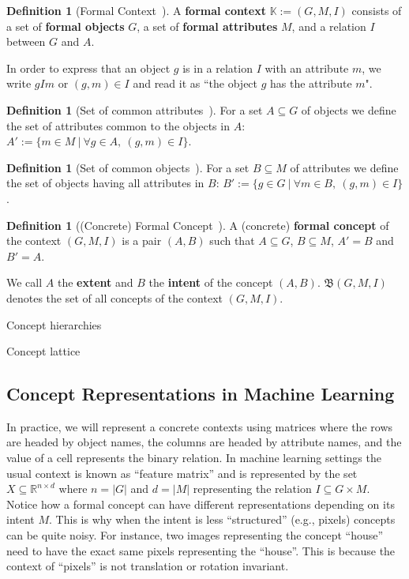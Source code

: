 \documentclass[withindex,glossary]{cam-thesis}
\theoremstyle{plain}
\theoremstyle{definition}
\newtheorem{definition}[theorem]{Definition}
\theoremstyle{remark}
\begin{document}
\begin{definition}[Formal Context~\citep{ganter1997formal}]
A \textbf{formal context} $\mathbb{K} := (G,M,I)$ consists of a set of \textbf{formal objects} $G$, a set of \textbf{formal attributes} $M$, and a relation $I$ between $G$ and $A$.
\end{definition}

In order to express that an object $g$ is in a relation $I$ with an attribute $m$, we write $gIm$ or $(g, m) \in I$ and read it as ``the object $g$ has the attribute $m$".

\begin{definition}[Set of common attributes~\citep{ganter1997formal}]
For a set $A \subseteq G$ of objects we define the set of attributes common to the objects in $A$: $A' := \{m \in M \ | \ \forall g \in A, \ (g,m) \in I \}$.
\end{definition}

\begin{definition}[Set of common objects~\citep{ganter1997formal}]
For a set $B \subseteq M$ of attributes we define the set of objects having all attributes in $B$: $B' := \{g \in G \ | \ \forall m \in B, \ (g,m) \in I \}$.
\end{definition}

\begin{definition}[(Concrete) Formal Concept~\citep{ganter1997formal}]
A (concrete) \textbf{formal concept} of the context $(G, M,I)$ is a pair $(A, B)$ such that $A \subseteq G$, $B \subseteq M$, $A' = B$ and $B' = A$.
\end{definition}

We call $A$ the \textbf{extent} and $B$ the \textbf{intent} of the concept $(A, B)$. $\mathfrak{B}(G, M, I)$ denotes the set of all concepts of the context $(G, M, I)$.

Concept hierarchies

Concept lattice

\subsection{Concept Representations in Machine Learning}
In practice, we will represent a concrete contexts using matrices where the rows are headed by object names, the columns are headed by attribute names, and the value of a cell represents the binary relation. In machine learning settings the usual context is known as ``feature matrix'' and is represented by the set $X \subseteq \mathbb{R}^{n \times d}$ where $n=|G|$ and $d=|M|$ representing the relation $I \subseteq G \times M$. 
Notice how a formal concept can have different representations depending on its intent $M$. 
This is why when the intent is less ``structured'' (e.g., pixels) concepts can be quite noisy. For instance, two images representing the concept ``house'' need to have the exact same pixels representing the ``house''. This is because the context of ``pixels'' is not translation or rotation invariant. 
\end{document}
